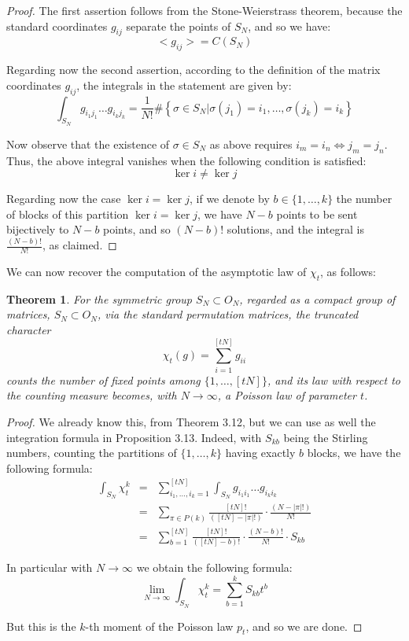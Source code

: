 \documentclass[12pt]{amsbook}
\newtheorem{theorem}{Theorem}[chapter]
\begin{document}
\begin{proof}
The first assertion follows from the Stone-Weierstrass theorem, because the standard coordinates $g_{ij}$ separate the points of $S_N$, and so we have:
$$<g_{ij}>=C(S_N)$$

Regarding now the second assertion, according to the definition of the matrix coordinates $g_{ij}$, the integrals in the statement are given by:
$$\int_{S_N}g_{i_1j_1}\ldots g_{i_kj_k}=\frac{1}{N!}\#\left\{\sigma\in S_N\Big|\sigma(j_1)=i_1,\ldots,\sigma(j_k)=i_k\right\}$$

Now observe that the existence of $\sigma\in S_N$ as above requires $i_m=i_n\iff j_m=j_n$. Thus, the above integral vanishes when the following condition is satisfied:
$$\ker i\neq\ker j$$

Regarding now the case $\ker i=\ker j$, if we denote by $b\in\{1,\ldots,k\}$ the number of blocks of this partition $\ker i=\ker j$, we have $N-b$ points to be sent bijectively to $N-b$ points, and so $(N-b)!$ solutions, and the integral is $\frac{(N-b)!}{N!}$, as claimed.
\end{proof}

We can now recover the computation of the asymptotic law of $\chi_t$, as follows:


\begin{theorem}
For the symmetric group $S_N\subset O_N$, regarded as a compact group of matrices, $S_N\subset O_N$, via the standard permutation matrices, the truncated character
$$\chi_t(g)=\sum_{i=1}^{[tN]}g_{ii}$$
counts the number of fixed points among $\{1,\ldots,[tN]\}$, and its law with respect to the counting measure becomes, with $N\to\infty$, a Poisson law of parameter $t$. 
\end{theorem}

\begin{proof}
We already know this, from Theorem 3.12, but we can use as well the integration formula in Proposition 3.13. Indeed, with $S_{kb}$ being the Stirling numbers, counting the partitions of $\{1,\ldots,k\}$ having exactly $b$ blocks, we have the following formula:
\begin{eqnarray*}
\int_{S_N}\chi_t^k
&=&\sum_{i_1,\ldots,i_k=1}^{[tN]}\int_{S_N}g_{i_1i_1}\ldots g_{i_ki_k}\\
&=&\sum_{\pi\in P(k)}\frac{[tN]!}{([tN]-|\pi|!)}\cdot\frac{(N-|\pi|!)}{N!}\\
&=&\sum_{b=1}^{[tN]}\frac{[tN]!}{([tN]-b)!}\cdot\frac{(N-b)!}{N!}\cdot S_{kb}
\end{eqnarray*}

In particular with $N\to\infty$ we obtain the following formula:
$$\lim_{N\to\infty}\int_{S_N}\chi_t^k=\sum_{b=1}^kS_{kb}t^b$$

But this is the $k$-th moment of the Poisson law $p_t$, and so we are done.
\end{proof}
\end{document}
